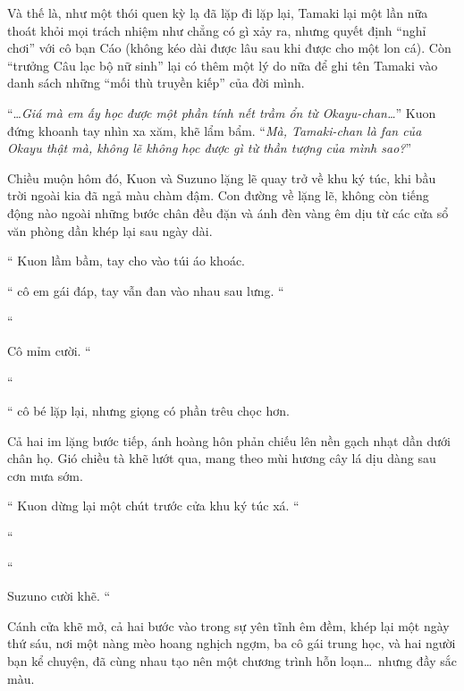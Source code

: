 \documentclass[../main.tex]{subfiles}
\begin{document}
Và thế là, như một thói quen kỳ lạ đã lặp đi lặp lại, Tamaki lại một lần nữa thoát khỏi mọi trách nhiệm như chẳng có gì xảy ra, nhưng quyết định ``nghỉ chơi'' với cô bạn Cáo (không kéo dài được lâu sau khi được cho một lon cá). Còn ``trưởng Câu lạc bộ nữ sinh'' lại có thêm một lý do nữa để ghi tên Tamaki vào danh sách những ``mối thù truyền kiếp'' của đời mình.

``\dots \textit{Giá mà em ấy học được một phần tính nết trầm ổn từ Okayu-chan\dots}'' Kuon đứng khoanh tay nhìn xa xăm, khẽ lẩm bẩm. ``\textit{Mà, Tamaki-chan là fan của Okayu thật mà, không lẽ không học được gì từ thần tượng của mình sao?}''

\ct

Chiều muộn hôm đó, Kuon và Suzuno lặng lẽ quay trở về khu ký túc, khi bầu trời ngoài kia đã ngả màu chàm đậm. Con đường về lặng lẽ, không còn tiếng động nào ngoài những bước chân đều đặn và ánh đèn vàng êm dịu từ các cửa sổ văn phòng dần khép lại sau ngày dài.

`` Kuon lầm bầm, tay cho vào túi áo khoác.

`` cô em gái đáp, tay vẫn đan vào nhau sau lưng. ``

``

Cô mỉm cười. ``

``

`` cô bé lặp lại, nhưng giọng có phần trêu chọc hơn.

Cả hai im lặng bước tiếp, ánh hoàng hôn phản chiếu lên nền gạch nhạt dần dưới chân họ. Gió chiều tà khẽ lướt qua, mang theo mùi hương cây lá dịu dàng sau cơn mưa sớm.

`` Kuon dừng lại một chút trước cửa khu ký túc xá. ``

``

``

Suzuno cười khẽ. ``

Cánh cửa khẽ mở, cả hai bước vào trong sự yên tĩnh êm đềm, khép lại một ngày thứ sáu, nơi một nàng mèo hoang nghịch ngợm, ba cô gái trung học, và hai người bạn kể chuyện, đã cùng nhau tạo nên một chương trình hỗn loạn\dots\ nhưng đầy sắc màu.
\end{document}
